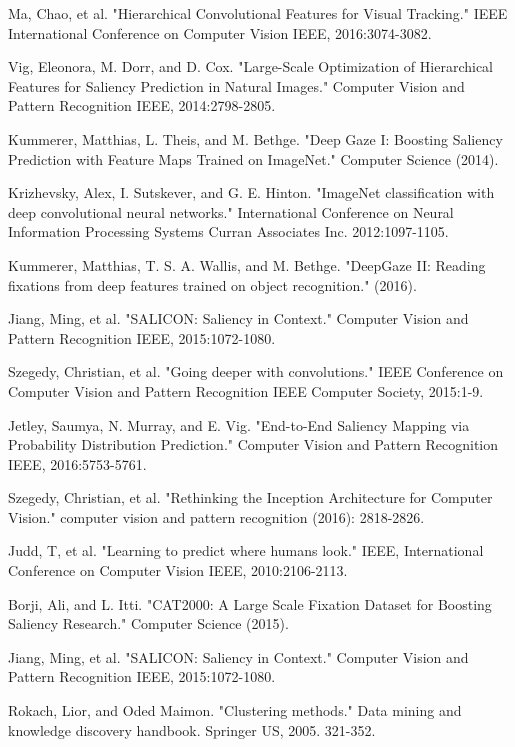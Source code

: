 \documentclass[letterpaper, 10 pt, conference]{ieeeconf}  %
\begin{document}
\begin{thebibliography}{00}
 Ma, Chao, et al. "Hierarchical Convolutional Features for Visual Tracking." IEEE International Conference on Computer Vision IEEE, 2016:3074-3082.

 Vig, Eleonora, M. Dorr, and D. Cox. "Large-Scale Optimization of Hierarchical Features for Saliency Prediction in Natural Images." Computer Vision and Pattern Recognition IEEE, 2014:2798-2805.

 Kummerer, Matthias, L. Theis, and M. Bethge. "Deep Gaze I: Boosting Saliency Prediction with Feature Maps Trained on ImageNet." Computer Science (2014).

 Krizhevsky, Alex, I. Sutskever, and G. E. Hinton. "ImageNet classification with deep convolutional neural networks." International Conference on Neural Information Processing Systems Curran Associates Inc. 2012:1097-1105.

 Kummerer, Matthias, T. S. A. Wallis, and M. Bethge. "DeepGaze II: Reading fixations from deep features trained on object recognition." (2016).

 Jiang, Ming, et al. "SALICON: Saliency in Context." Computer Vision and Pattern Recognition IEEE, 2015:1072-1080.

 Szegedy, Christian, et al. "Going deeper with convolutions." IEEE Conference on Computer Vision and Pattern Recognition IEEE Computer Society, 2015:1-9.

 Jetley, Saumya, N. Murray, and E. Vig. "End-to-End Saliency Mapping via Probability Distribution Prediction." Computer Vision and Pattern Recognition IEEE, 2016:5753-5761.

 Szegedy, Christian, et al. "Rethinking the Inception Architecture for Computer Vision." computer vision and pattern recognition (2016): 2818-2826.

 Judd, T, et al. "Learning to predict where humans look." IEEE, International Conference on Computer Vision IEEE, 2010:2106-2113.

 Borji, Ali, and L. Itti. "CAT2000: A Large Scale Fixation Dataset for Boosting Saliency Research." Computer Science (2015).

 Jiang, Ming, et al. "SALICON: Saliency in Context." Computer Vision and Pattern Recognition IEEE, 2015:1072-1080.

 Rokach, Lior, and Oded Maimon. "Clustering methods." Data mining and knowledge discovery handbook. Springer US, 2005. 321-352.


\end{thebibliography}
\end{document}

